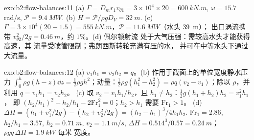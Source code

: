 \begin{solution}{exo:b2:flow-balances:11}
(a) $\Gamma = D_mr_1v_{\theta1} = 3 \times 10^4 \times 20 = \qty{600}{kN.m}$, $\omega = 15.7$ rad/s,
$\mathcal P = \qty{9.4}{MW}$. (b) $H = \mathcal P/\rho gD_V = \qty{32}{m}$. (c) $\Gamma = 3 \times
10^4(20 - 1.5) = \qty{555}{kN.m}$，$\mathcal P = \qty{11.6}{MW}$（水头 \qty{39}{m}）；
出口涡流携带 $v_{\theta2}^2/2g = \qty{0.46}{m}$，约 $1\%$。(d) 佩尔顿射流
处于大气压强：需较高水头才能获得高速，其
流量受喷管限制；弗朗西斯转轮充满有压的水，
并可在中等水头下通过大流量。
\end{solution}

\begin{solution}{exo:b2:flow-balances:12}
(a) $v_1h_1 = v_2h_2 = q$。(b) 作用于截面上的单位宽度静水压力
$\int_0^h\rho g(h - z)\dd z = \tfrac12\rho gh^2$；动量：$\tfrac12\rho g(h_1^2
- h_2^2) = \rho q(v_2 - v_1)$；除以 $\rho$，并利用 $q = v_1h_1 = v_2h_2$。
(c) 取 $v_2 = v_1h_1/h_2$，且 $h_1 \ne h_2$：$\tfrac12g(h_1 + h_2)h_2 = v_1^2h_1$，
即 $(h_2/h_1)^2 + h_2/h_1 - 2\mathrm{Fr}_1^2 = 0$；$h_2 > h_1$ 需要 $\mathrm{Fr}_1 > 1$。
(d) $\Delta H = (h_1 + v_1^2/2g) - (h_2 + v_2^2/2g) = (h_2 - h_1)^3/4h_1h_2$.
$\mathrm{Fr}_1 = 2.86$, $h_2/h_1 = 3.57$, $h_2 = \qty{0.71}{m}$, $v_2 = \qty{1.1}{m/s}$,
$\Delta H = 0.514^3/0.57 = \qty{0.24}{m}$；$\rho gq\,\Delta H = \qty{1.9}{kW}$ 每米
宽度。
\end{solution}

